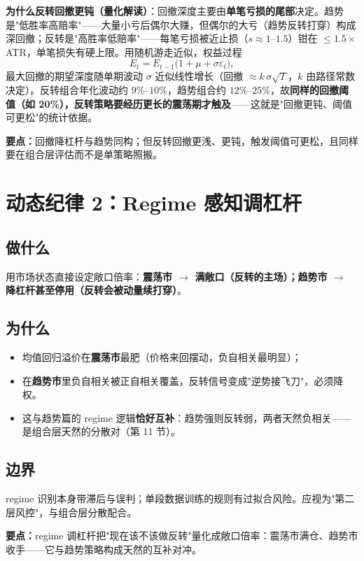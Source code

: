 \documentclass[UTF8,11pt]{ctexart}
\newcommand{\takeaway}[1]{\medskip\par\noindent\textbf{要点：}#1\par\medskip}
\begin{document}
\textbf{为什么反转回撤更钝（量化解读）}：回撤深度主要由\textbf{单笔亏损的尾部}决定。趋势是"低胜率高赔率"——大量小亏后偶尔大赚，但偶尔的大亏（趋势反转打穿）构成深回撤；反转是"高胜率低赔率"——每笔亏损被近止损（$s\approx1$--$1.5$）钳在 $\le1.5\times$ATR，单笔损失有硬上限。用随机游走近似，权益过程
\begin{equation}
E_t = E_{t-1}\big(1+\mu+\sigma\varepsilon_t\big),
\end{equation}
最大回撤的期望深度随单期波动 $\sigma$ 近似线性增长（回撤 $\approx k\,\sigma\sqrt{T}$，$k$ 由路径常数决定）。反转组合年化波动约 $9\%$--$10\%$，趋势组合约 $12\%$--$25\%$，故\textbf{同样的回撤阈值（如 20\%），反转策略要经历更长的震荡期才触及}——这就是"回撤更钝、阈值可更松"的统计依据。

\takeaway{回撤降杠杆与趋势同构；但反转回撤更浅、更钝，触发阈值可更松，且同样要在组合层评估而不是单策略照搬。}

\section{动态纪律 2：Regime 感知调杠杆}
\subsection{做什么}
用市场状态直接设定敞口倍率：\textbf{震荡市 $\to$ 满敞口（反转的主场）；趋势市 $\to$ 降杠杆甚至停用（反转会被动量续打穿）}。
\subsection{为什么}
\begin{itemize}[itemsep=2pt]
\item 均值回归溢价在\textbf{震荡市}最肥（价格来回摆动，负自相关最明显）；
\item 在\textbf{趋势市}里负自相关被正自相关覆盖，反转信号变成"逆势接飞刀"，必须降权。
\item 这与趋势篇的 regime 逻辑\textbf{恰好互补}：趋势强则反转弱，两者天然负相关——是组合层天然的分散对（第 11 节）。
\end{itemize}
\subsection{边界}
regime 识别本身带滞后与误判；单段数据训练的规则有过拟合风险。应视为"第二层风控"，与组合层分散配合。

\takeaway{regime 调杠杆把"现在该不该做反转"量化成敞口倍率：震荡市满仓、趋势市收手——它与趋势策略构成天然的互补对冲。}
\end{document}
